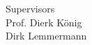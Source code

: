 \begin{titlepage}
\begin{center}



{\large
	Supervisors \\[\baselineskip]
	Prof. Dierk König\\
	Dirk Lemmermann\\[1cm]
}
\end{center}
\end{titlepage}

\begin{titlepage}
\thispagestyle{empty}
\newpage
\mbox{}
\end{titlepage}
